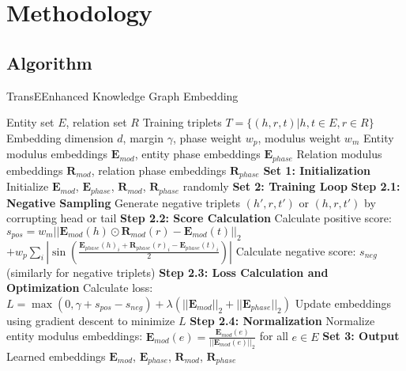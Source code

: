 \documentclass[11pt]{article}
\begin{document}
\section{Methodology}
\subsection{Algorithm}
\FloatBarrier

\begin{algorithm}[H]
\caption{TransEEnhanced Knowledge Graph Embedding}
\begin{algorithmic}[1]
\Require 
    Entity set $E$, relation set $R$
    Training triplets $T = \{(h, r, t) | h, t \in E, r \in R\}$
    Embedding dimension $d$, margin $\gamma$, phase weight $w_p$, modulus weight $w_m$
\Ensure 
    Entity modulus embeddings $\mathbf{E}_{mod}$, entity phase embeddings $\mathbf{E}_{phase}$
    Relation modulus embeddings $\mathbf{R}_{mod}$, relation phase embeddings $\mathbf{R}_{phase}$
\Statex \textbf{Set 1: Initialization}
\State Initialize $\mathbf{E}_{mod}$, $\mathbf{E}_{phase}$, $\mathbf{R}_{mod}$, $\mathbf{R}_{phase}$ randomly
\Statex \textbf{Set 2: Training Loop}
        \Statex \textbf{Step 2.1: Negative Sampling}
        \State Generate negative triplets $(h', r, t')$ or $(h, r, t')$ by corrupting head or tail
        \Statex \textbf{Step 2.2: Score Calculation}
        \State Calculate positive score: 
        \State $s_{pos} = w_m ||\mathbf{E}_{mod}(h) \odot \mathbf{R}_{mod}(r) - \mathbf{E}_{mod}(t)||_2$
        \State $+ w_p \sum_i |\sin(\frac{\mathbf{E}_{phase}(h)_i + \mathbf{R}_{phase}(r)_i - \mathbf{E}_{phase}(t)_i}{2})|$
        \State Calculate negative score: $s_{neg}$ (similarly for negative triplets)
        \Statex \textbf{Step 2.3: Loss Calculation and Optimization}
        \State Calculate loss: 
        \State $L = \max(0, \gamma + s_{pos} - s_{neg}) + \lambda (||\mathbf{E}_{mod}||_2 + ||\mathbf{E}_{phase}||_2)$
        \State Update embeddings using gradient descent to minimize $L$
    \EndFor
    \Statex \textbf{Step 2.4: Normalization}
    \State Normalize entity modulus embeddings: 
    \State $\mathbf{E}_{mod}(e) = \frac{\mathbf{E}_{mod}(e)}{||\mathbf{E}_{mod}(e)||_2}$ for all $e \in E$
\EndFor
\Statex \textbf{Set 3: Output}
\State \Return Learned embeddings $\mathbf{E}_{mod}$, $\mathbf{E}_{phase}$, $\mathbf{R}_{mod}$, $\mathbf{R}_{phase}$
\end{algorithmic}
\end{algorithm}
\end{document}

